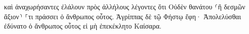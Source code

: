 \documentclass{openreader}
\begin{document}
καὶ ἀναχωρήσαντες ἐλάλουν πρὸς ἀλλήλους λέγοντες ὅτι Οὐδὲν θανάτου ⸂ἢ δεσμῶν ἄξιον⸃ ⸀τι πράσσει ὁ ἄνθρωπος οὗτος. 
Ἀγρίππας δὲ τῷ Φήστῳ ἔφη· Ἀπολελύσθαι ἐδύνατο ὁ ἄνθρωπος οὗτος εἰ μὴ ἐπεκέκλητο Καίσαρα. 
\end{document}
